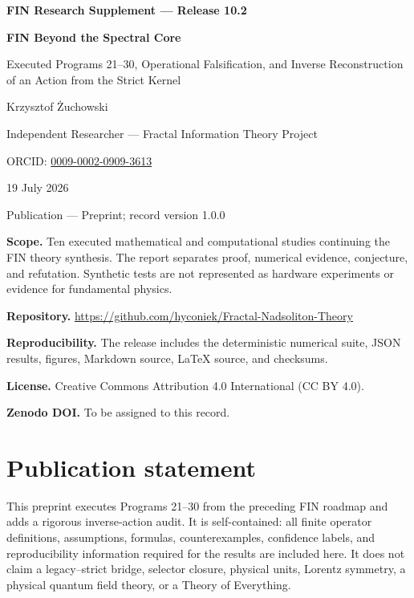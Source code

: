 \documentclass[11pt,a4paper,openany]{report}
\begin{document}
\hypersetup{pageanchor=false}
\begin{titlepage}
\centering
\vspace*{12mm}
{\Large\bfseries FIN Research Supplement --- Release 10.2\par}
\vspace{12mm}
{\Huge\bfseries FIN Beyond the Spectral Core\par}
\vspace{6mm}
{\Large Executed Programs 21--30, Operational Falsification, and Inverse Reconstruction of an Action from the Strict Kernel\par}
\vspace{18mm}
{\Large Krzysztof Żuchowski\par}
\vspace{2mm}
{\normalsize Independent Researcher --- Fractal Information Theory Project\par}
\vspace{2mm}
{\normalsize ORCID: \href{https://orcid.org/0009-0002-0909-3613}{0009-0002-0909-3613}\par}
\vspace{10mm}
{\large 19 July 2026\par}
{\normalsize Publication --- Preprint; record version 1.0.0\par}
\vfill
\begin{minipage}{0.88\textwidth}
\small
\textbf{Scope.} Ten executed mathematical and computational studies continuing the FIN theory synthesis. The report separates proof, numerical evidence, conjecture, and refutation. Synthetic tests are not represented as hardware experiments or evidence for fundamental physics.

\medskip
\textbf{Repository.} \url{https://github.com/hyconiek/Fractal-Nadsoliton-Theory}

\textbf{Reproducibility.} The release includes the deterministic numerical suite, JSON results, figures, Markdown source, LaTeX source, and checksums.

\textbf{License.} Creative Commons Attribution 4.0 International (CC BY 4.0).

\textbf{Zenodo DOI.} To be assigned to this record.
\end{minipage}
\vfill
\end{titlepage}
\hypersetup{pageanchor=true}

\chapter*{Publication statement}
This preprint executes Programs 21--30 from the preceding FIN roadmap and adds a rigorous inverse-action audit. It is self-contained: all finite operator definitions, assumptions, formulas, counterexamples, confidence labels, and reproducibility information required for the results are included here. It does not claim a legacy--strict bridge, selector closure, physical units, Lorentz symmetry, a physical quantum field theory, or a Theory of Everything.
\end{document}
